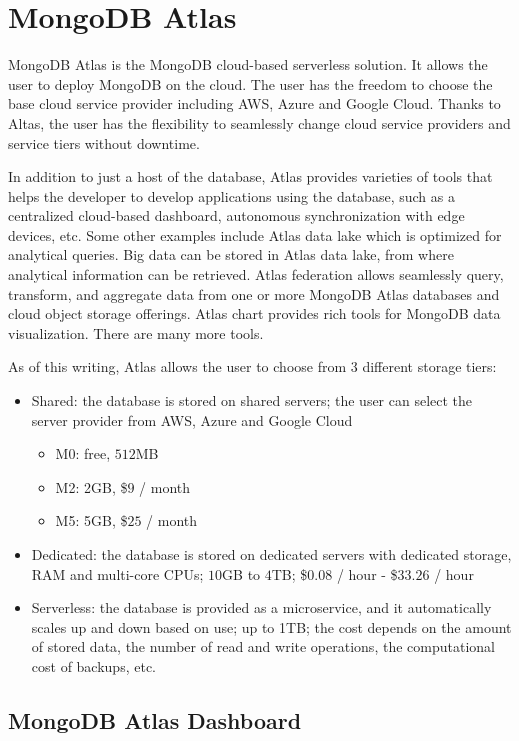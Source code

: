 \section{MongoDB Atlas}

MongoDB Atlas is the MongoDB cloud-based serverless solution. It allows the user to deploy MongoDB on the cloud. The user has the freedom to choose the base cloud service provider including AWS, Azure and Google Cloud. Thanks to Altas, the user has the flexibility to seamlessly change cloud service providers and service tiers without downtime. 

In addition to just a host of the database, Atlas provides varieties of tools that helps the developer to develop applications using the database, such as a centralized cloud-based dashboard, autonomous synchronization with edge devices, etc. Some other examples include Atlas data lake which is optimized for analytical queries. Big data can be stored in Atlas data lake, from where analytical information can be retrieved. Atlas federation allows seamlessly query, transform, and aggregate data from one or more MongoDB Atlas databases and cloud object storage offerings. Atlas chart provides rich tools for MongoDB data visualization. There are many more tools.

As of this writing, Atlas allows the user to choose from 3 different storage tiers:
\begin{itemize}
  \item Shared: the database is stored on shared servers; the user can select the server provider from AWS, Azure and Google Cloud
  \begin{itemize}
    \item M0: free, $512$MB
    \item M2: 2GB, \$$9$ / month
    \item M5: 5GB, \$$25$ / month
  \end{itemize}
  \item Dedicated: the database is stored on dedicated servers with dedicated storage, RAM and multi-core CPUs; $10$GB to $4$TB; \$$0.08$ / hour - \$$33.26$ / hour
  \item Serverless: the database is provided as a microservice, and it automatically scales up and down based on use; up to 1TB; the cost depends on the amount of stored data, the number of read and write operations, the computational cost of backups, etc.
\end{itemize}

\subsection{MongoDB Atlas Dashboard}

